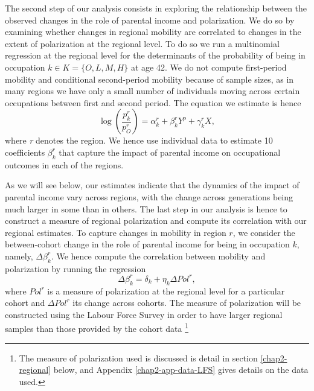 The second step of our analysis consists in exploring the relationship between the observed changes in the role of parental income and polarization. We do so by examining whether changes in regional mobility are correlated to changes in the extent of polarization at the regional level. To do so we run a multinomial regression at the regional level for the determinants of the probability of being in occupation $k \in K = \{O, L , M, H\}$ at age 42. We do not compute first-period mobility and conditional second-period mobility because of sample sizes, as in many regions we have only a small number of individuals moving across certain occupations between first and second period. The equation we estimate is hence
\begin{equation}\label{chap2-eq:regocc-multi2}
    \log\left(\frac{p^r_k}{p^r_O}\right) = \alpha^r_{k} + \beta^r_{k} Y^p + \gamma^r_{k} X,
\end{equation}
where \emph{r} denotes the region. We hence use individual data to estimate 10 coefficients $\beta^r_{k}$ that capture the impact of parental income on occupational outcomes in each of the regions.

As we will see below, our estimates indicate that the dynamics of the impact of parental income vary across regions, with the change across generations being much larger in some than in others. The last step in our analysis is hence to construct a measure of regional polarization and compute its correlation with our regional estimates. To capture changes in mobility in region $r$, we consider the between-cohort change in the role of parental income for being in occupation $k$, namely, $\Delta\beta_k^r$. We hence compute the correlation between mobility and polarization by running the regression
\begin{equation}\label{chap2-eq:reg-multi2}
    \Delta\beta_k^r = \delta_{k} + \eta_{k} \Delta Pol^r,
\end{equation}
where $Pol^r$ is a measure of polarization at the regional level for a particular cohort and $\Delta Pol^r$ its change across cohorts. The measure of polarization will be constructed using the Labour Force Survey in order to have larger regional samples than those provided by the cohort data \footnote{The measure of polarization used is discussed is detail in section \ref{chap2-regional} below, and Appendix \ref{chap2-app-data-LFS} gives details on the data used.} 







